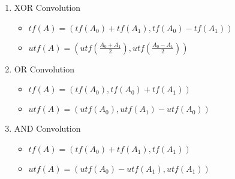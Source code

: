 \begin{enumerate}
    \item XOR Convolution
        \vspace{-1em}
        \begin{itemize}
            \itemsep-0.3em
            \item $tf(A) = (tf(A_0) + tf(A_1), tf(A_0) - tf(A_1))$
            \item $utf(A) = (utf(\frac{A_0 + A_1}{2}), utf(\frac{A_0 - A_1}{2}))$
        \end{itemize}
    \item OR Convolution
        \vspace{-1em}
        \begin{itemize}
            \itemsep-0.3em
            \item $tf(A) = (tf(A_0), tf(A_0) + tf(A_1))$
            \item $utf(A) = (utf(A_0), utf(A_1) - utf(A_0))$
        \end{itemize}
    \item AND Convolution
        \vspace{-1em}
        \begin{itemize}
            \itemsep-0.3em
            \item $tf(A) = (tf(A_0) + tf(A_1), tf(A_1))$
            \item $utf(A) = (utf(A_0) - utf(A_1), utf(A_1))$
        \end{itemize}
\end{enumerate}
